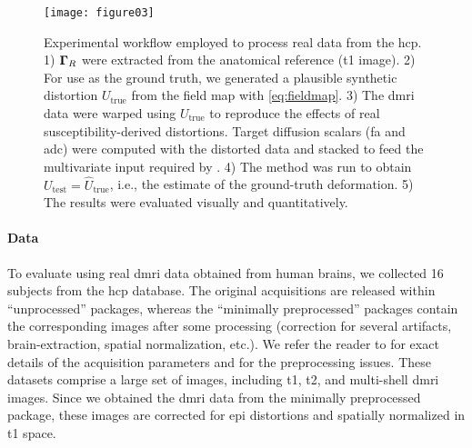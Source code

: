 \begin{figure*}
\texttt{[image: figure03]}
\caption{Experimental workflow employed to process real data from the \acrfull*{hcp}.
  1) $\boldsymbol{\Gamma}_R$ were extracted from the anatomical reference (\gls*{t1} image).
  2) For use as the ground truth, we generated a plausible synthetic distortion $U_\text{true}$
    from the field map with \eqref{eq:fieldmap}.
  3) The \gls*{dmri} data were warped using $U_\text{true}$ to reproduce the effects of real
    susceptibility-derived distortions.
  Target diffusion scalars (\gls*{fa} and \gls*{adc}) were computed with the distorted data and
    stacked to feed the multivariate input required by \regseg{}.
  4) The method was run to obtain $U_\text{test} = \hat{U}_\text{true}$, i.e., the estimate of
    the ground-truth deformation.
  5) The results were evaluated visually and quantitatively.
  }\label{fig:evworkflows}
\end{figure*}


\paragraph*{Data}
To evaluate \regseg{} using real \gls*{dmri} data obtained from human brains,
  we collected 16 subjects from the \gls*{hcp} database.
The original acquisitions are released within ``unprocessed'' packages, whereas
  the ``minimally preprocessed'' packages contain the corresponding images after
  some processing (correction for several artifacts, brain-extraction, spatial
  normalization, etc.).
We refer the reader to \citep{essen_human_2012} for exact details of the acquisition
  parameters and \citep{glasser_minimal_2013} for the preprocessing issues.
These datasets comprise a large set of images, including \gls*{t1}, \gls*{t2}, and
  multi-shell \gls*{dmri} images.
Since we obtained the \gls*{dmri} data from the minimally preprocessed package, these
  images are corrected for \gls*{epi} distortions and spatially normalized in
  \gls*{t1} space.

